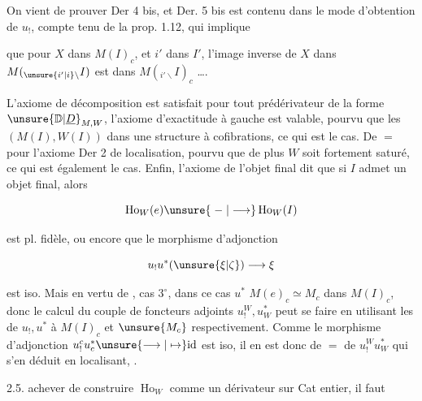 On vient de prouver Der 4 bis, et Der. 5 bis
est  contenu dans le mode d'obtention de 
$u_!$, compte tenu de la prop. 1.12, qui implique

que pour 
 $X$ dans $M(I)_c$, et $i'$ dans $I'$, l'image inverse
de $X$ dans $M({}_{\unsure{i'|i}\backslash}I)$ est dans $M({}_{i'\backslash}I)_c$ \ldots.

L'axiome de décomposition est satisfait pour
tout prédérivateur de la forme $\unsure{\mathbb{D}|\underline{D}}_{M,W}$, 
 l'axiome d'exactitude à gauche  est valable,
pourvu que les $(M(I),W(I))$  dans
une structure à cofibrations, ce qui est le cas.
De $=$ pour l'axiome Der 2 de localisation,
pourvu que de plus $W$ soit fortement
saturé, ce qui est également le cas. Enfin,
l'axiome de l'objet final dit que si
$I$ admet un objet final, alors

\[
 \operatorname{Ho}_W(e)\unsure{\;-\;|\longrightarrow}\operatorname{Ho}_W(I)
\]

est pl. fidèle, ou encore que le morphisme
d'adjonction

\[
 u_!u^*(\unsure{\xi|\zeta})\longrightarrow \xi
\]

est iso. Mais en vertu de , cas $3^\circ$,
dans ce cas $u^*$  $M(e)_c\simeq M_c$ dans
$M(I)_c$, donc le calcul du couple de
foncteurs adjoints $u_!^W,u^*_W$ peut se faire en
utilisant les  de $u_!,u^*$ à $M(I)_c$ et
$\unsure{M_c}$ respectivement. Comme le morphisme
d'adjonction $u_!^c u_c^*\unsure{\longrightarrow|\mapsto}\mathrm{id}$ est iso, il en
est donc de $=$ de $u_!^W u^*_W$ qui s'en
déduit en localisant, .

2.5.  achever de construire $\operatorname{Ho}_W$ comme
un dérivateur sur Cat  entier, il faut

